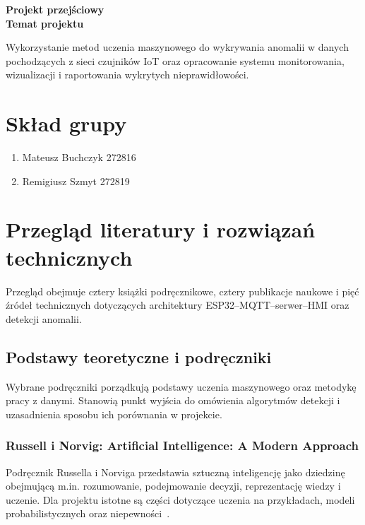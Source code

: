 \documentclass[12pt,a4paper]{article}
\begin{document}
\begin{center}
    {\LARGE \textbf{Projekt przejściowy}}\\[1cm]
    {\large \textbf{Temat projektu}}
\end{center}

\bigskip

Wykorzystanie metod uczenia maszynowego do wykrywania anomalii
w danych pochodzących z sieci czujników IoT oraz opracowanie
systemu monitorowania, wizualizacji i raportowania wykrytych
nieprawidłowości.

\vspace{1cm}

\section*{Skład grupy}

\begin{enumerate}
    \item Mateusz Buchczyk 272816
    \item Remigiusz Szmyt 272819
\end{enumerate}

\clearpage
\section{Przegląd literatury i rozwiązań technicznych}
\label{sec:literatura}

Przegląd obejmuje cztery książki podręcznikowe, cztery publikacje naukowe
i pięć źródeł technicznych dotyczących architektury ESP32--MQTT--serwer--HMI
oraz detekcji anomalii.

\subsection{Podstawy teoretyczne i podręczniki}

Wybrane podręczniki porządkują podstawy uczenia maszynowego oraz metodykę
pracy z danymi. Stanowią punkt wyjścia do omówienia algorytmów detekcji
i uzasadnienia sposobu ich porównania w projekcie.

\subsubsection{Russell i Norvig: Artificial Intelligence: A Modern Approach}
Podręcznik Russella i Norviga przedstawia sztuczną inteligencję jako dziedzinę
obejmującą m.in. rozumowanie, podejmowanie decyzji, reprezentację wiedzy
i uczenie. Dla projektu istotne są części dotyczące uczenia na przykładach,
modeli probabilistycznych oraz niepewności~\cite{russell2020}.
\end{document}
